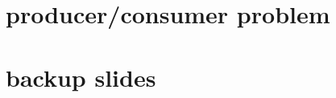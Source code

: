 \documentclass[aspectratio=169]{mytalk}
\title{}
\date{}
\begin{document}





\section{producer/consumer problem}




\begin{frame}{}
\end{frame}

\section{backup slides}




\end{document}
